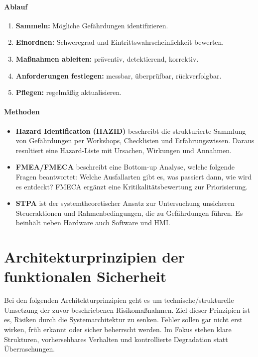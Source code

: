 \paragraph{Ablauf}
\begin{enumerate}
  \item \textbf{Sammeln:} Mögliche Gefährdungen identifizieren.
  \item \textbf{Einordnen:} Schweregrad und Eintrittswahrscheinlichkeit bewerten.
  \item \textbf{Maßnahmen ableiten:} präventiv, detektierend, korrektiv.
  \item \textbf{Anforderungen festlegen:} messbar, überprüfbar, rückverfolgbar.
  \item \textbf{Pflegen:} regelmäßig aktualisieren.
\end{enumerate}

\paragraph{Methoden}
\begin{itemize}
  \item \textbf{Hazard Identification (HAZID)} beschreibt die strukturierte Sammlung von Gefährdungen per Workshops, Checklisten
        und Erfahrungswissen. Daraus resultiert eine Hazard-Liste mit Ursachen, Wirkungen und Annahmen.
  \item \textbf{FMEA/FMECA} beschreibt eine Bottom-up Analyse, welche folgende Fragen beantwortet: Welche Ausfallarten gibt es,
        was passiert dann, wie wird es entdeckt? FMECA ergänzt eine Kritikalitätsbewertung zur Priorisierung.
  \item \textbf{STPA} ist der systemtheoretischer Ansatz zur Untersuchung unsicheren Steueraktionen und Rahmenbedingungen, die 
        zu Gefährdungen führen. Es beinhält neben Hardware auch Software und HMI.
\end{itemize}

\section{Architekturprinzipien der funktionalen Sicherheit}\label{sec:arch-fusa}
Bei den folgenden Architekturprinzipien geht es um technische/strukturelle Umsetzung der zuvor beschriebenen Risikomaßnahmen.
Ziel dieser Prinzipien ist es, Risiken durch die Systemarchitektur zu senken. Fehler sollen gar nicht erst wirken,
früh erkannt oder sicher beherrscht werden. Im Fokus stehen klare Strukturen, vorhersehbares Verhalten und
kontrollierte Degradation statt Überraschungen.

